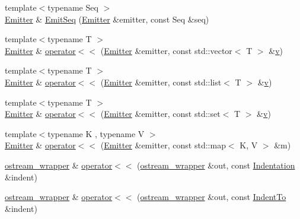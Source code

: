 \begin{DoxyCompactItemize}
\item 
{\footnotesize template$<$typename Seq $>$ }\\\mbox{\hyperlink{class_y_a_m_l_1_1_emitter}{Emitter}} \& \mbox{\hyperlink{namespace_y_a_m_l_a743b83b17fbbadcae7358c7aaa17a2e3}{Emit\+Seq}} (\mbox{\hyperlink{class_y_a_m_l_1_1_emitter}{Emitter}} \&emitter, const Seq \&seq)
\item 
{\footnotesize template$<$typename T $>$ }\\\mbox{\hyperlink{class_y_a_m_l_1_1_emitter}{Emitter}} \& \mbox{\hyperlink{namespace_y_a_m_l_ad51cdb0606a48c3d2d8587cbbb7d5fef}{operator$<$$<$}} (\mbox{\hyperlink{class_y_a_m_l_1_1_emitter}{Emitter}} \&emitter, const std\+::vector$<$ T $>$ \&\mbox{\hyperlink{glad_8h_a14cfbe2fc2234f5504618905b69d1e06}{v}})
\item 
{\footnotesize template$<$typename T $>$ }\\\mbox{\hyperlink{class_y_a_m_l_1_1_emitter}{Emitter}} \& \mbox{\hyperlink{namespace_y_a_m_l_ae0a4d3270d7ded1e06da6e249b8eceb0}{operator$<$$<$}} (\mbox{\hyperlink{class_y_a_m_l_1_1_emitter}{Emitter}} \&emitter, const std\+::list$<$ T $>$ \&\mbox{\hyperlink{glad_8h_a14cfbe2fc2234f5504618905b69d1e06}{v}})
\item 
{\footnotesize template$<$typename T $>$ }\\\mbox{\hyperlink{class_y_a_m_l_1_1_emitter}{Emitter}} \& \mbox{\hyperlink{namespace_y_a_m_l_a5d9f3850631942c28fa6455067269e60}{operator$<$$<$}} (\mbox{\hyperlink{class_y_a_m_l_1_1_emitter}{Emitter}} \&emitter, const std\+::set$<$ T $>$ \&\mbox{\hyperlink{glad_8h_a14cfbe2fc2234f5504618905b69d1e06}{v}})
\item 
{\footnotesize template$<$typename K , typename V $>$ }\\\mbox{\hyperlink{class_y_a_m_l_1_1_emitter}{Emitter}} \& \mbox{\hyperlink{namespace_y_a_m_l_a64496783db5f3d6c1dd7449ffafcf361}{operator$<$$<$}} (\mbox{\hyperlink{class_y_a_m_l_1_1_emitter}{Emitter}} \&emitter, const std\+::map$<$ K, V $>$ \&m)
\item 
\mbox{\hyperlink{class_y_a_m_l_1_1ostream__wrapper}{ostream\+\_\+wrapper}} \& \mbox{\hyperlink{namespace_y_a_m_l_a0f06b3ab1ad090af5004ef6a2a4e2ebd}{operator$<$$<$}} (\mbox{\hyperlink{class_y_a_m_l_1_1ostream__wrapper}{ostream\+\_\+wrapper}} \&out, const \mbox{\hyperlink{struct_y_a_m_l_1_1_indentation}{Indentation}} \&indent)
\item 
\mbox{\hyperlink{class_y_a_m_l_1_1ostream__wrapper}{ostream\+\_\+wrapper}} \& \mbox{\hyperlink{namespace_y_a_m_l_ac73a08b5b96a7d5ae9e1ccad98f39fe1}{operator$<$$<$}} (\mbox{\hyperlink{class_y_a_m_l_1_1ostream__wrapper}{ostream\+\_\+wrapper}} \&out, const \mbox{\hyperlink{struct_y_a_m_l_1_1_indent_to}{Indent\+To}} \&indent)

\end{DoxyCompactItemize}
